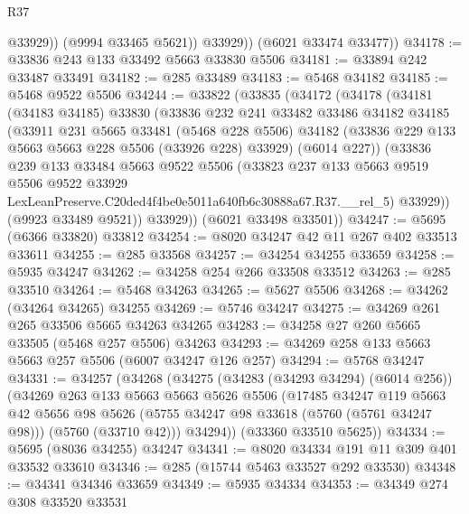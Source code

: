 \begin{lexlean}{R37}
\begin{coremodule}
                @33929))
            (@9994 @33465 @5621))
          @33929))
      (@6021 @33474 @33477))
@34178 := @33836 @243 @133 @33492 @5663 @33830 @5506
@34181 := @33894 @242 @33487 @33491
@34182 := @285 @33489
@34183 := @5468 @34182
@34185 := @5468 @9522 @5506
@34244 := @33822
    (@33835
      (@34172
        (@34178
          (@34181
            (@34183 @34185)
            @33830
            (@33836
              @232
              @241
              @33482
              @33486
              @34182
              @34185
              (@33911
                @231
                @5665
                @33481
                (@5468 @228 @5506)
                @34182
                (@33836 @229 @133 @5663 @5663 @228 @5506 (@33926 @228) @33929)
                (@6014 @227))
              (@33836
                @239
                @133
                @33484
                @5663
                @9522
                @5506
                (@33823
                  @237
                  @133
                  @5663
                  @9519
                  @5506
                  @9522
                  @33929
                  LexLeanPreserve.C20ded4f4be0e5011a640fb6c30888a67.R37.__rel_5)
                @33929))
            (@9923 @33489 @9521))
          @33929))
      (@6021 @33498 @33501))
@34247 := @5695 (@6366 @33820) @33812
@34254 := @8020 @34247 @42 @11 @267 @402 @33513 @33611
@34255 := @285 @33568
@34257 := @34254 @34255 @33659
@34258 := @5935 @34247
@34262 := @34258 @254 @266 @33508 @33512
@34263 := @285 @33510
@34264 := @5468 @34263
@34265 := @5627 @5506
@34268 := @34262 (@34264 @34265) @34255
@34269 := @5746 @34247
@34275 := @34269 @261 @265 @33506 @5665 @34263 @34265
@34283 := @34258 @27 @260 @5665 @33505 (@5468 @257 @5506) @34263
@34293 := @34269 @258 @133 @5663 @5663 @257 @5506 (@6007 @34247 @126 @257)
@34294 := @5768 @34247
@34331 := @34257
    (@34268
      (@34275
        (@34283 (@34293 @34294) (@6014 @256))
        (@34269
          @263
          @133
          @5663
          @5663
          @5626
          @5506
          (@17485
            @34247
            @119
            @5663
            @42
            @5656
            @98
            @5626
            (@5755 @34247 @98 @33618 (@5760 (@5761 @34247 @98)))
            (@5760 (@33710 @42)))
          @34294))
      (@33360 @33510 @5625))
@34334 := @5695 (@8036 @34255) @34247
@34341 := @8020 @34334 @191 @11 @309 @401 @33532 @33610
@34346 := @285 (@15744 @5463 @33527 @292 @33530)
@34348 := @34341 @34346 @33659
@34349 := @5935 @34334
@34353 := @34349 @274 @308 @33520 @33531

\end{coremodule}
\end{lexlean}
